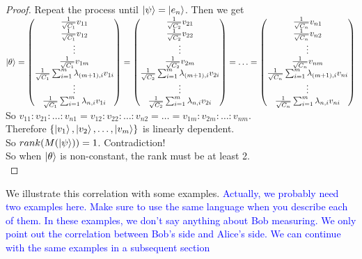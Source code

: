 \begin{proof}
Repeat the process until $\ket{\psi}=\ket{e_n}$. Then we get\\
$\ket{\theta}
=\begin{pmatrix}
\frac{1}{\sqrt{C_1}}v_{11}\\
\frac{1}{\sqrt{C_1}}v_{12}\\
\vdots\\
\frac{1}{\sqrt{C_1}}v_{1m}\\
\frac{1}{\sqrt{C_1}}\sum_{i=1}^m \lambda_{(m+1), i} v_{1i}\\
\vdots\\
\frac{1}{\sqrt{C_1}}\sum_{i=1}^m \lambda_{n, i} v_{1i}
\end{pmatrix}
=\begin{pmatrix}
\frac{1}{\sqrt{C_2}}v_{21}\\
\frac{1}{\sqrt{C_2}}v_{22}\\
\vdots\\
\frac{1}{\sqrt{C_2}}v_{2m}\\
\frac{1}{\sqrt{C_2}}\sum_{i=1}^m \lambda_{(m+1), i} v_{2i}\\
\vdots\\
\frac{1}{\sqrt{C_2}}\sum_{i=1}^m \lambda_{n, i} v_{2i}
\end{pmatrix}
=\hdots
=\begin{pmatrix}
\frac{1}{\sqrt{C_n}}v_{n1}\\
\frac{1}{\sqrt{C_n}}v_{n2}\\
\vdots\\
\frac{1}{\sqrt{C_n}}v_{nm}\\
\frac{1}{\sqrt{C_n}}\sum_{i=1}^m \lambda_{(m+1), i} v_{ni}\\
\vdots\\
\frac{1}{\sqrt{C_n}}\sum_{i=1}^m \lambda_{n, i} v_{ni}
\end{pmatrix}$\\
So $v_{11}:v_{21}:\hdots:v_{n1}=v_{12}:v_{22}:\hdots:v_{n2}=\hdots=v_{1m}:v_{2m}:\hdots:v_{nm}$.\\
Therefore $\{\ket{v_1}, \ket{v_2},\hdots, \ket{v_m}\}$ is linearly dependent.\\
So $rank(M(\ket{\psi})) = 1$. Contradiction!\\
So when $\ket{\theta}$ is non-constant, the rank must be at least 2.\\
\end{proof}

We illustrate this correlation with some examples.
\textcolor{blue}{Actually, we probably need two examples here.  Make sure to use the same language when you describe each of them.  In these examples, we don't say anything about Bob measuring.  We only point out the correlation between Bob's side and Alice's side.  We can continue with the same examples in a subsequent section}

